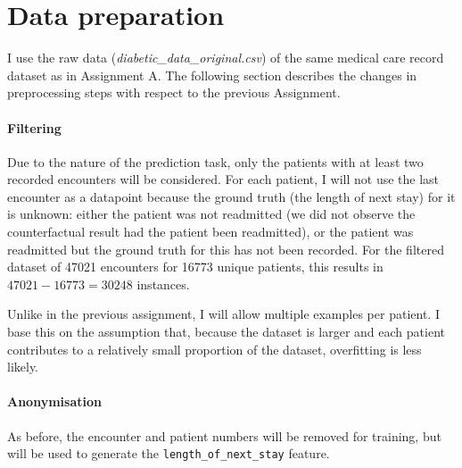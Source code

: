 \documentclass[10pt, twocolumn]{article}
\begin{document}
\thispagestyle{first}
\pagestyle{plain}


\section{Data preparation}

I use the raw data (\textit{diabetic\_data\_original.csv}) of the same medical care record dataset \cite{strack2014dataset} as in Assignment A. The following section describes the changes in preprocessing steps with respect to the previous Assignment.

\paragraph{Filtering}
Due to the nature of the prediction task, only the patients with at least two recorded encounters will be considered. For each patient, I will not use the last encounter as a datapoint because the ground truth (the length of next stay) for it is unknown: either the patient was not readmitted (we did not observe the counterfactual result had the patient been readmitted), or the patient was readmitted but the ground truth for this has not been recorded. For the filtered dataset of 47021 encounters for 16773 unique patients, this results in $47021-16773=30248$ instances.

Unlike in the previous assignment, I will allow multiple examples per patient. I base this on the assumption that, because the dataset is larger and each patient contributes to a relatively small proportion of the dataset, overfitting is less likely.


\paragraph{Anonymisation} As before, the encounter and patient numbers will be removed for training, but will be used to generate the \texttt{length\_of\_next\_stay} feature.
\end{document}
